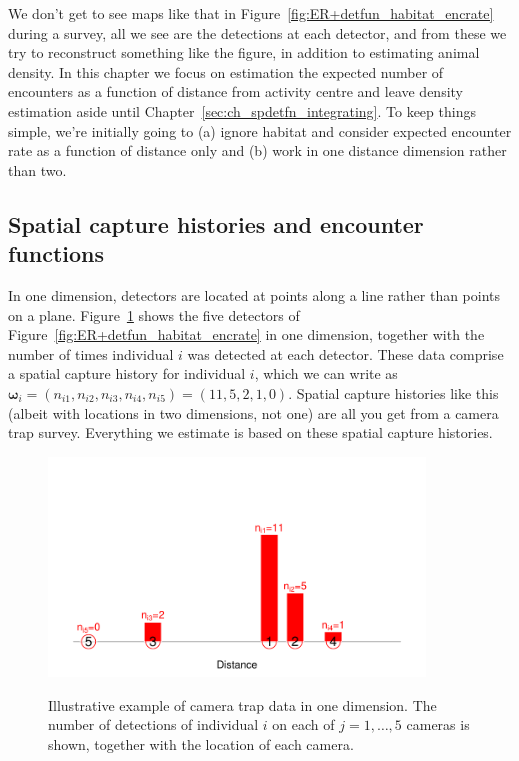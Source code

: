 \documentclass[graybox,envcountchap,sectrefs]{SpringerStyleFiles/styles/svmono}\usepackage[]{graphicx}\usepackage[]{color}
\begin{document}
We don't get to see maps like that in Figure~\ref{fig:ER+detfun_habitat_encrate} during a survey, all we see are the detections at each detector, and from these we try to reconstruct something like the figure, in addition to estimating animal density. In this chapter we focus on estimation the expected number of encounters as a function of distance from activity centre and leave density estimation aside until Chapter~\ref{sec:ch_spdetfn_integrating}. To keep things simple, we're initially going to (a) ignore habitat and consider expected encounter rate as a function of distance only and (b) work in one distance dimension rather than two. 

\subsection{Spatial capture histories and encounter functions}
\label{subsec:ER+detfun.spatialCH}

In one dimension, detectors are located at points along a line rather than points on a plane. Figure~\ref{fig:ER+detfun_enc} shows the five detectors of Figure~\ref{fig:ER+detfun_habitat_encrate} in one dimension, together with the number of times individual $i$ was detected at each detector. These data comprise a spatial capture history for individual $i$, which we can write as $\bm{\omega}_i=(n_{i1},n_{i2},n_{i3},n_{i4},n_{i5})=(11,5,2,1,0)$. Spatial capture histories like this (albeit with locations in two dimensions, not one) are all you get from a camera trap survey. Everything we estimate is based on these spatial capture histories.


\begin{figure}[ht]
\caption{\small Illustrative example of camera trap data in one dimension. The number of detections of individual $i$ on each of $j=1,\ldots,5$ cameras is shown, together with the location of each camera.}
\centering
\vspace{-24pt}
\includegraphics[width=10cm]{keepfigure/ObsN.pdf}
\label{fig:ER+detfun_enc}
\end{figure}
\end{document}

